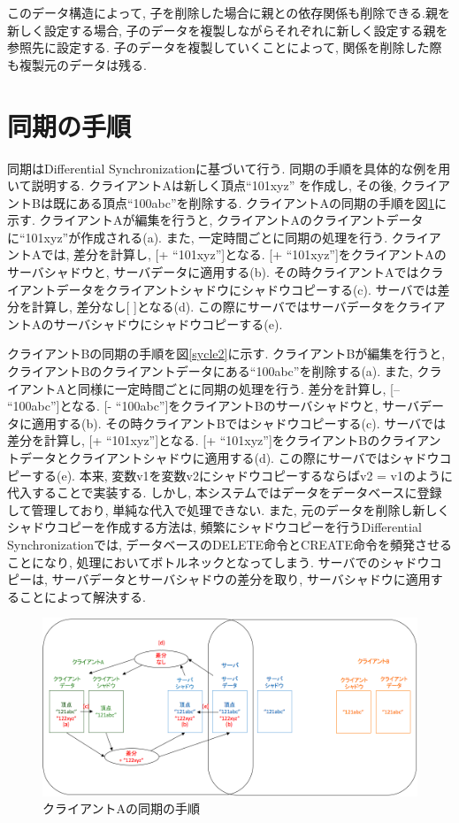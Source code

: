 このデータ構造によって, 子を削除した場合に親との依存関係も削除できる.親を新しく設定する場合, 子のデータを複製しながらそれぞれに新しく設定する親を参照先に設定する.
子のデータを複製していくことによって, 関係を削除した際も複製元のデータは残る.

\section{同期の手順}
同期はDifferential Synchronizationに基づいて行う.
同期の手順を具体的な例を用いて説明する. クライアントAは新しく頂点``101xyz''
を作成し, その後, クライアントBは既にある頂点``100abc''を削除する.
クライアントAの同期の手順を図\ref{sycle1}に示す.
クライアントAが編集を行うと, クライアントAのクライアントデータに``101xyz''が作成される(a).
また, 一定時間ごとに同期の処理を行う. クライアントAでは, 差分を計算し, [+ ``101xyz'']となる. [+ ``101xyz'']をクライアントAのサーバシャドウと, サーバデータに適用する(b). その時クライアントAではクライアントデータをクライアントシャドウにシャドウコピーする(c). サーバでは差分を計算し, 差分なし[ ]となる(d). この際にサーバではサーバデータをクライアントAのサーバシャドウにシャドウコピーする(e).
\par
クライアントBの同期の手順を図\ref{sycle2}に示す.
クライアントBが編集を行うと, クライアントBのクライアントデータにある``100abc''を削除する(a).
また, クライアントAと同様に一定時間ごとに同期の処理を行う. 差分を計算し, [-- ``100abc'']となる. [- ``100abc'']をクライアントBのサーバシャドウと, サーバデータに適用する(b). その時クライアントBではシャドウコピーする(c). サーバでは差分を計算し, [+ ``101xyz'']となる. [+ ``101xyz'']をクライアントBのクライアントデータとクライアントシャドウに適用する(d). この際にサーバではシャドウコピーする(e).
本来, 変数v1を変数v2にシャドウコピーするならばv2 = v1のように代入することで実装する. しかし, 本システムではデータをデータベースに登録して管理しており, 単純な代入で処理できない.
また, 元のデータを削除し新しくシャドウコピーを作成する方法は, 頻繁にシャドウコピーを行うDifferential Synchronizationでは,
データベースのDELETE命令とCREATE命令を頻発させることになり, 処理においてボトルネックとなってしまう. サーバでのシャドウコピーは, サーバデータとサーバシャドウの差分を取り, サーバシャドウに適用することによって解決する.
\begin{figure}[htbp]
  \begin{center}
    \includegraphics[scale=0.3]{images/sycle1}
    \caption{クライアントAの同期の手順}
    \label{sycle1}
  \end{center}
\end{figure}

